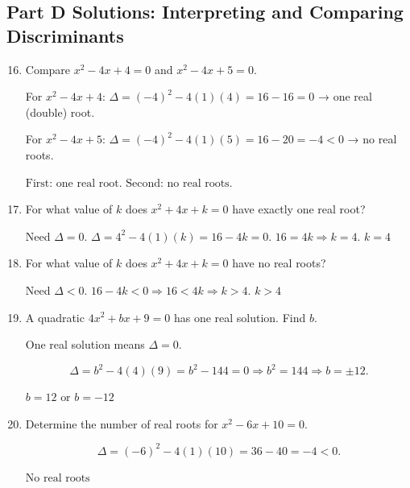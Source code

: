 \documentclass[14pt]{extarticle}
\begin{document}
\subsection*{Part D Solutions: Interpreting and Comparing Discriminants}
\begin{enumerate}
  \setcounter{enumi}{15}
  \item Compare \(x^2 - 4x + 4 = 0\) and \(x^2 - 4x + 5 = 0.\)

  For \(x^2 - 4x + 4\):  
  \(\Delta = (-4)^2 - 4(1)(4) = 16 - 16 = 0\) → one real (double) root.

  For \(x^2 - 4x + 5\):  
  \(\Delta = (-4)^2 - 4(1)(5) = 16 - 20 = -4 < 0\) → no real roots.

  \(\boxed{\text{First: one real root. Second: no real roots.}}\)

  \item For what value of \(k\) does \(x^2 + 4x + k = 0\) have exactly one real root?

  Need \(\Delta = 0.\)  
  \(\Delta = 4^2 - 4(1)(k) = 16 - 4k = 0.\)  
  \(16 = 4k \Rightarrow k = 4.\)  
  \(\boxed{k = 4}\)

  \item For what value of \(k\) does \(x^2 + 4x + k = 0\) have no real roots?

  Need \(\Delta < 0.\)  
  \(16 - 4k < 0 \Rightarrow 16 < 4k \Rightarrow k > 4.\)  
  \(\boxed{k > 4}\)

  \item A quadratic \(4x^2 + bx + 9 = 0\) has one real solution. Find \(b.\)

  One real solution means \(\Delta = 0.\)

  \[
  \Delta = b^2 - 4(4)(9) = b^2 - 144 = 0
  \Rightarrow b^2 = 144
  \Rightarrow b = \pm 12.
  \]

  \(\boxed{b = 12 \text{ or } b = -12}\)

  \item Determine the number of real roots for \(x^2 - 6x + 10 = 0.\)

  \[
  \Delta = (-6)^2 - 4(1)(10) = 36 - 40 = -4 < 0.
  \]

  \(\boxed{\text{No real roots}}\)
\end{enumerate}
\end{document}

